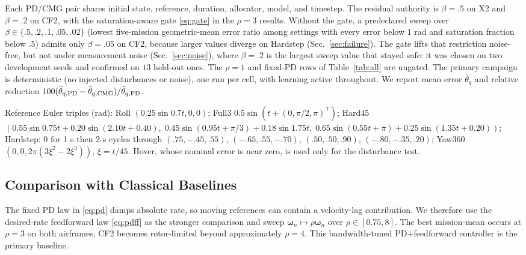 \documentclass[letterpaper, 10 pt, conference]{ieeeconf}
\newcommand{\T}{^{\mathsf T}}
\begin{document}
Each PD/CMG pair shares initial state, reference, duration, allocator, model, and timestep. The residual authority is $\beta=.5$ on X2 and $\beta=.2$ on CF2, with the saturation-aware gate \eqref{eq:gate} in the $\rho=3$ results. Without the gate, a predeclared sweep over $\beta\in\{.5,.2,.1,.05,.02\}$ (lowest five-mission geometric-mean error ratio among settings with every error below $1$ rad and saturation fraction below $.5$) admits only $\beta=.05$ on CF2, because larger values diverge on Hardstep (Sec.~\ref{sec:failure}). The gate lifts that restriction noise-free, but not under measurement noise (Sec.~\ref{sec:noise}), where $\beta=.2$ is the largest sweep value that stayed safe: it was chosen on two development seeds and confirmed on $13$ held-out ones. The $\rho=1$ and fixed-PD rows of Table~\ref{tab:all} are ungated. The primary campaign is deterministic (no injected disturbances or noise), one run per cell, with learning active throughout. We report mean error $\bar\theta_q$ and relative reduction $100(\bar\theta_{q,\rm PD}-\bar\theta_{q,\rm CMG})/\bar\theta_{q,\rm PD}$.

Reference Euler triples (rad): Roll $(0.25\sin0.7t,0,0)$; Full3 $0.5\sin(t+(0,\pi/2,\pi)\T)$; Hard45
$(0.55\sin0.75t+0.20\sin(2.10t+0.40),\allowbreak\;0.45\sin(0.95t+\pi/3)+0.18\sin1.75t,\allowbreak\;0.65\sin(0.55t+\pi)+0.25\sin(1.35t+0.20))$;
Hardstep: $0$ for 1 s then 2-s cycles through $(.75,-.45,.55)$, $(-.65,.55,-.70)$, $(.50,.50,.90)$, $(-.80,-.35,.20)$; Yaw360 $(0,0,2\pi(3\xi^2-2\xi^3))$, $\xi=t/45$. Hover, whose nominal error is near zero, is used only for the disturbance test.

\subsection{Comparison with Classical Baselines}
\label{sec:baselines}
The fixed PD law in \eqref{eq:pd} damps absolute rate, so moving references can contain a velocity-lag contribution. We therefore use the desired-rate feedforward law \eqref{eq:pdff} as the stronger comparison and sweep $\bm\omega_n\mapsto\rho\bm\omega_n$ over $\rho\in[0.75,8]$. The best mission-mean occurs at $\rho=3$ on both airframes; CF2 becomes rotor-limited beyond approximately $\rho=4$. This bandwidth-tuned PD+feedforward controller is the primary baseline.
\end{document}

